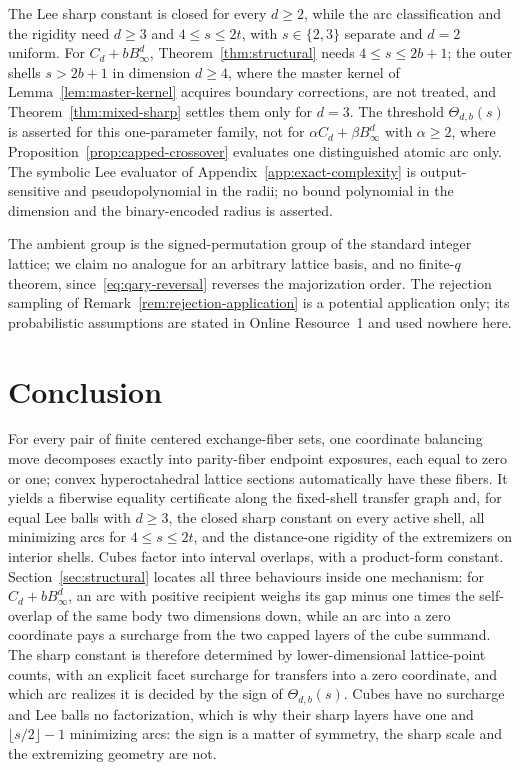 \documentclass[pdflatex,sn-mathphys-num]{sn-jnl}
\theoremstyle{thmstyleone}
\theoremstyle{thmstylethree}
\theoremstyle{thmstyletwo}
\begin{document}
The Lee sharp constant is closed for every
$d\ge2$, while the arc classification and the rigidity need $d\ge3$ and
$4\le s\le2t$, with $s\in\{2,3\}$ separate and $d=2$ uniform.
For $C_d+bB_\infty^d$,
Theorem~\ref{thm:structural} needs $4\le s\le2b+1$; the outer shells
$s>2b+1$ in dimension $d\ge4$, where the master kernel of
Lemma~\ref{lem:master-kernel} acquires boundary corrections, are not treated,
and Theorem~\ref{thm:mixed-sharp} settles them only for $d=3$.  The threshold
$\Theta_{d,b}(s)$ is asserted for this one-parameter family, not for
$\alpha C_d+\beta B_\infty^d$ with $\alpha\ge2$, where
Proposition~\ref{prop:capped-crossover} evaluates one distinguished atomic arc
only.  The symbolic Lee evaluator of Appendix~\ref{app:exact-complexity} is
output-sensitive and pseudopolynomial in the radii; no bound polynomial in the
dimension and the binary-encoded radius is asserted.

The ambient group is the signed-permutation group of the standard integer
lattice; we claim no analogue for an arbitrary lattice basis, and no
finite-$q$ theorem, since~\eqref{eq:qary-reversal} reverses the majorization
order.  The rejection sampling of Remark~\ref{rem:rejection-application} is a
potential application only; its probabilistic assumptions are stated in Online
Resource~1 and used nowhere here.



\section{Conclusion}

For every pair of finite centered exchange-fiber sets, one coordinate
balancing move decomposes exactly into parity-fiber endpoint exposures,
each equal to zero or one; convex hyperoctahedral lattice sections
automatically have these fibers.  It yields a fiberwise equality certificate
along the fixed-shell transfer graph and, for equal Lee balls with $d\ge3$,
the closed sharp constant on every active shell, all minimizing arcs for
$4\le s\le2t$, and the distance-one rigidity of the extremizers on interior
shells.
Cubes factor into interval overlaps, with a product-form
constant.  Section~\ref{sec:structural} locates
all three behaviours inside one mechanism: for $C_d+bB_\infty^d$, an arc with
positive recipient weighs its gap minus one times the self-overlap of the same
body two dimensions down, while an arc into a zero coordinate pays a surcharge
from the two capped layers of the cube summand.  The sharp constant is
therefore determined by lower-dimensional lattice-point counts, with an
explicit facet surcharge
for transfers into a zero coordinate, and which arc realizes it is decided by
the sign of $\Theta_{d,b}(s)$.  Cubes have no surcharge and Lee balls no
factorization, which is why their sharp layers have one and
$\lfloor s/2\rfloor-1$ minimizing arcs: the sign is a matter of symmetry, the
sharp scale and the extremizing geometry are not.
\end{document}
